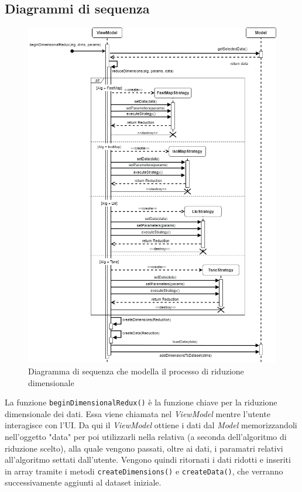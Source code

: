 \subsection{Diagrammi di sequenza}
\begin{figure}[hb]
\includegraphics[width=12cm]{Images/Allegato Tecnico-Sequenza-DR}
\centering
\caption{Diagramma di sequenza che modella il processo di riduzione dimensionale}
\end{figure}
La funzione \texttt{beginDimensionalRedux()} è la funzione chiave per la riduzione dimensionale dei dati. Essa viene chiamata nel \textit{ViewModel} mentre l'utente interagisce con l'UI. Da qui il \textit{ViewModel} ottiene i dati dal \textit{Model} memorizzandoli nell'oggetto "data" per poi utilizzarli nella relativa  (a seconda dell'algoritmo di riduzione scelto), alla quale vengono passati, oltre ai dati, i paramatri relativi all'algoritmo settati dall'utente.
Vengono quindi ritornati i dati ridotti e inseriti in array tramite i metodi \texttt{createDimensions()} e \texttt{createData()}, che verranno successivamente aggiunti al dataset iniziale.
\newpage
